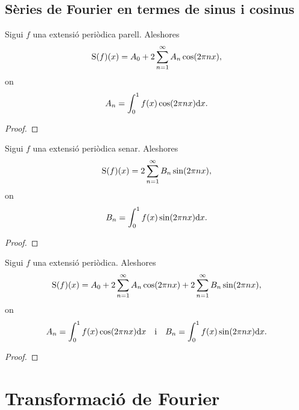 \documentclass[../Apunts.tex]{subfiles}
\begin{document}
	\subsection{Sèries de Fourier en termes de sinus i cosinus}
	\begin{proposition}
		\label{prop:sèrie de Fourier d'una funció parell}
		Sigui \(f\) una extensió periòdica parell. Aleshores
		\[\operatorname{S}(f)(x)=A_{0}+2\sum_{n=1}^{\infty}A_{n}\cos(2\pi nx),\]
		on
		\[A_{n}=\int_{0}^{1}f(x)\cos(2\pi nx)\mathrm{d} x.\] %
		\begin{proof}
		\end{proof}
	\end{proposition}
	\begin{proposition}
		\label{prop:sèrie de Fourier d'una funció senar}
		Sigui \(f\) una extensió periòdica senar. Aleshores
		\[\operatorname{S}(f)(x)=2\sum_{n=1}^{\infty}B_{n}\sin(2\pi nx),\]
		on
		\[B_{n}=\int_{0}^{1}f(x)\sin(2\pi nx)\mathrm{d} x.\]
		\begin{proof}
		\end{proof}
	\end{proposition}
	\begin{theorem}
		Sigui \(f\) una extensió periòdica. Aleshores
		\[\operatorname{S}(f)(x)=A_{0}+2\sum_{n=1}^{\infty}A_{n}\cos(2\pi nx)+2\sum_{n=1}^{\infty}B_{n}\sin(2\pi nx),\]
		on
		\[A_{n}=\int_{0}^{1}f(x)\cos(2\pi nx)\mathrm{d} x\quad\text{i}\quad B_{n}=\int_{0}^{1}f(x)\sin(2\pi nx)\mathrm{d} x.\]
		\begin{proof}
		\end{proof}
	\end{theorem}
\section{Transformació de Fourier}
\end{document}
